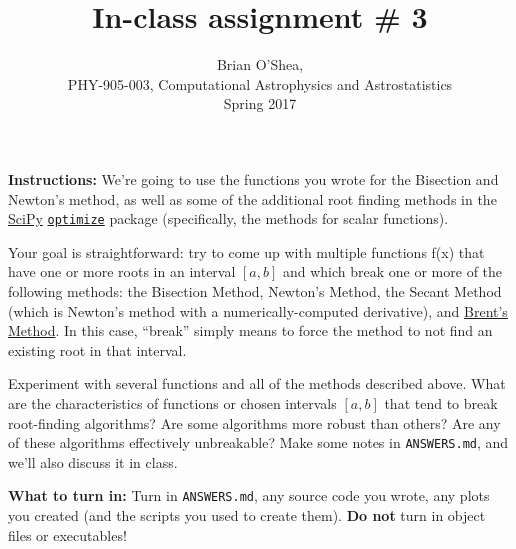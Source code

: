 \documentclass[10pt]{article}
\title{In-class assignment \# 3}
\author{Brian O'Shea, \\PHY-905-003, Computational Astrophysics and
  Astrostatistics\\Spring 2017}
\date{} %
\begin{document}
 
\maketitle

\vspace{-5mm}

\noindent \textbf{Instructions:} We're going to use the functions you
wrote for the Bisection and Newton's method, as well as some of the
additional root finding methods in the
\href{https://docs.scipy.org}{SciPy}
\href{https://docs.scipy.org/doc/scipy-0.18.1/reference/optimize.html#root-finding}{\texttt{optimize}}
package (specifically, the methods for scalar functions).

Your goal is straightforward: try to come up with multiple functions
f(x) that have one or more roots in an interval $[a,b]$ and which
break one or more of the following methods: the Bisection Method,
Newton's Method, the Secant Method (which is Newton's method with a
numerically-computed derivative), and
\href{http://mathworld.wolfram.com/BrentsMethod.html}{Brent's Method}.
In this case, ``break'' simply means to force the method to not find
an existing root in that interval.

Experiment with several functions and all of the methods described
above.  What are the characteristics of functions or chosen intervals
$[a,b]$ that tend to break root-finding algorithms?  Are some
algorithms more robust than others?  Are any of these algorithms
effectively unbreakable?  Make some notes in \texttt{ANSWERS.md}, and
we'll also discuss it in class.

\vspace{5mm}

\noindent 
\textbf{What to turn in:} Turn in \texttt{ANSWERS.md}, any
source code you wrote, any plots you created (and the scripts you used
to create them).  \textbf{Do not} turn in object files or
executables!
\end{document}
